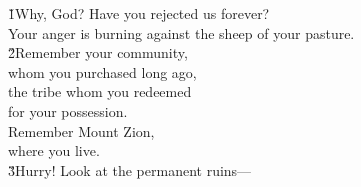 
\begin{poetry}
\poeml \v{1}Why, God? Have you rejected us forever? \\
\poemll    Your anger is burning against the sheep of your pasture. \\
\poeml \v{2}Remember your community, \\
\poeml whom you purchased long ago, \\
\poeml the tribe whom you redeemed \\
\poemll    for your possession. \\
\poeml Remember Mount Zion, \\
\poemll    where you live. \\
\poemlll       \v{3}Hurry! Look at the permanent ruins---
\end{poetry}


